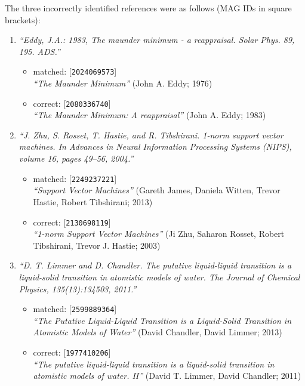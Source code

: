 The three incorrectly identified references were as follows (MAG IDs in square brackets):
\begin{enumerate}
    \item \emph{``Eddy, J.A.: 1983, The maunder minimum - a reappraisal. Solar Phys. 89, 195. ADS.''}
    \begin{itemize}
        \item matched: [\texttt{2024069573}]\\\emph{``The Maunder Minimum''} (John A. Eddy; 1976)
        \item correct: [\texttt{2080336740}]\\\emph{``The Maunder Minimum: A reappraisal''} (John A. Eddy; 1983)
    \end{itemize}
    \item \emph{``J. Zhu, S. Rosset, T. Hastie, and R. Tibshirani. 1-norm support vector machines. In Advances in Neural Information Processing Systems (NIPS), volume 16, pages 49–56, 2004.''}
    \begin{itemize}
        \item matched: [\texttt{2249237221}]\\\emph{``Support Vector Machines''} (Gareth James, Daniela Witten, Trevor Hastie, Robert Tibshirani; 2013)
        \item correct: [\texttt{2130698119}]\\\emph{``1-norm Support Vector Machines''} (Ji Zhu, Saharon Rosset, Robert Tibshirani, Trevor J. Hastie; 2003)
    \end{itemize}
    \item \emph{``D. T. Limmer and D. Chandler. The putative liquid-liquid transition is a liquid-solid transition in atomistic models of water. The Journal of Chemical Physics, 135(13):134503, 2011.''}
    \begin{itemize}
        \item matched: [\texttt{2599889364}]\\\emph{``The Putative Liquid-Liquid Transition is a Liquid-Solid Transition in Atomistic Models of Water''} (David Chandler, David Limmer; 2013)
        \item correct: [\texttt{1977410206}]\\\emph{``The putative liquid-liquid transition is a liquid-solid transition in atomistic models of water. II''} (David T. Limmer, David Chandler; 2011)
    \end{itemize}
\end{enumerate}


